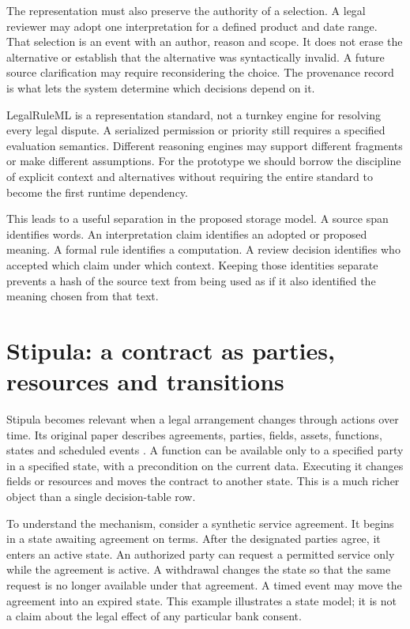 \documentclass[12pt,a4paper,oneside,openany]{book}
\begin{document}
The representation must also preserve the authority of a selection. A legal
reviewer may adopt one interpretation for a defined product and date range.
That selection is an event with an author, reason and scope. It does not erase
the alternative or establish that the alternative was syntactically invalid.
A future source clarification may require reconsidering the choice. The
provenance record is what lets the system determine which decisions depend on it.

LegalRuleML is a representation standard, not a turnkey engine for resolving
every legal dispute. A serialized permission or priority still requires a
specified evaluation semantics. Different reasoning engines may support
different fragments or make different assumptions. For the prototype we should
borrow the discipline of explicit context and alternatives without requiring
the entire standard to become the first runtime dependency.

This leads to a useful separation in the proposed storage model. A source span
identifies words. An interpretation claim identifies an adopted or proposed
meaning. A formal rule identifies a computation. A review decision identifies
who accepted which claim under which context. Keeping those identities
separate prevents a hash of the source text from being used as if it also
identified the meaning chosen from that text.

\section{Stipula: a contract as parties, resources and transitions}
\label{merge:M04:05}

\label{sec:languages-stipula}
Stipula becomes relevant when a legal arrangement changes through actions over
time. Its original paper describes agreements, parties, fields, assets,
functions, states and scheduled events \citep[secs.~3--6]{stipula2021}. A
function can be available only to a specified party in a specified state, with
a precondition on the current data. Executing it changes fields or resources
and moves the contract to another state. This is a much richer object than
a single decision-table row.

To understand the mechanism, consider a synthetic service agreement. It begins
in a state awaiting agreement on terms. After the designated parties agree,
it enters an active state. An authorized party can request a permitted service
only while the agreement is active. A withdrawal changes the state so that
the same request is no longer available under that agreement. A timed event
may move the agreement into an expired state. This example illustrates a state
model; it is not a claim about the legal effect of any particular bank consent.
\end{document}
